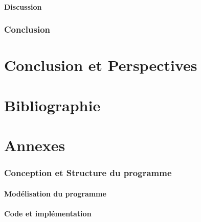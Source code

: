 \documentclass[12pt,a4paper]{article}
\begin{document}
		\subsection{Discussion}
   
    
		\section*{Conclusion}
		
	\newpage
		
	\part*{Conclusion et Perspectives}
	\newpage
	
	\part*{Bibliographie}
	
	 
	
	
	\newpage
	
	\appendix
	\part*{Annexes}
		
	\section{Conception et Structure du programme}
	\subsection{Modélisation du programme}
	\subsection{Code et implémentation}
	
\end{document}
